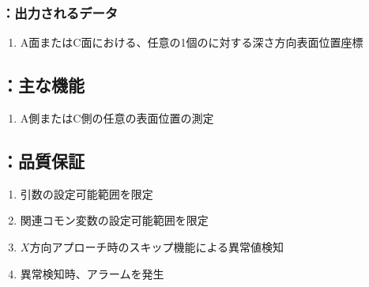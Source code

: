 \subsubsection{\DMLthreeAC：出力されるデータ}
\begin{enumerate}[label*=\sarrow]
\item A面またはC面における、任意の1個の\Dimple に対する深さ方向表面位置座標
\end{enumerate}


\subsection{\DMLthreeAC：主な機能}
\begin{enumerate}[label*=\sarrow]
\item A側またはC側の任意の\Dimple 表面位置の測定
\end{enumerate}


\subsection{\DMLthreeAC：品質保証}
\begin{enumerate}[label*=\sarrow]
\item {}引数の設定可能範囲を限定
\item 関連コモン変数の設定可能範囲を限定
\item $X$方向アプローチ時のスキップ機能による異常値検知
\item 異常検知時、アラームを発生
\end{enumerate}



\clearpage


